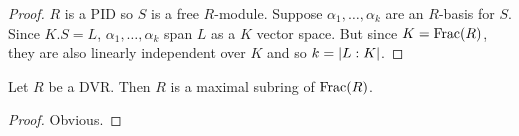 \documentclass{memoir}
\begin{document}
\begin{proof}
    $R$ is a PID so $S$ is a free $R$-module.
    Suppose $\alpha_1,\dots,\alpha_k$ are an $R$-basis for $S$.
    Since $K.S = L$, $\alpha_1,\dots,\alpha_k$ span $L$ as a $K$ vector space.
    But since $K = \text{Frac}(R)$, they are also linearly independent over $K$ and so $k = \lvert L:K\rvert$.
\end{proof}
\begin{proposition}
    Let $R$ be a DVR.
    Then $R$ is a maximal subring of $\text{Frac}(R)$.
\end{proposition}
\begin{proof}
    Obvious.
\end{proof}
\end{document}
